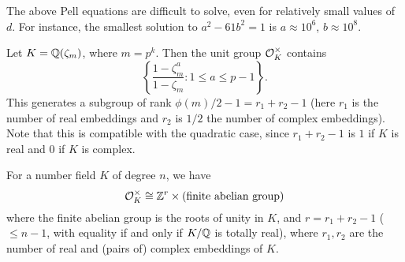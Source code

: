 \begin{remark}
  The above Pell equations are difficult to solve, even for
  relatively small values of $d$. For instance, the
  smallest solution to $a^2 - 61 b^2 = 1$ is
  $a \approx 10^6$, $b \approx 10^8$.
\end{remark}

\begin{example}
  Let $K = \mathbb{Q}(\zeta_m)$, where $m = p^k$. Then the unit group
  $\mathcal{O}_K^\times$ contains
  \[
    \left\{
      \frac{1 - \zeta_m^a}{1 - \zeta_m} : 1 \le a \le p - 1
    \right\}.
  \]
  This generates a subgroup of rank $\phi(m) / 2 - 1 = r_1 + r_2 - 1$ (here $r_1$ is the number of real embeddings
  and $r_2$ is $1 / 2$ the number of complex embeddings).
  Note that this is compatible with the quadratic case,
  since $r_1 + r_2 - 1$ is $1$ if $K$ is real and $0$ if $K$
  is complex.
\end{example}

\begin{theorem}
  For a number field $K$ of degree $n$, we have
  \[
    \mathcal{O}_K^\times \cong \mathbb{Z}^{r} \times (\text{finite abelian group})
  \]
  where the finite abelian group is the roots of unity in $K$,
  and $r = r_1 + r_2 - 1$ ($\le n - 1$, with equality if and
  only if $K / \mathbb{Q}$ is totally real), where $r_1, r_2$
  are the number of real and (pairs of) complex embeddings
  of $K$.
\end{theorem}
